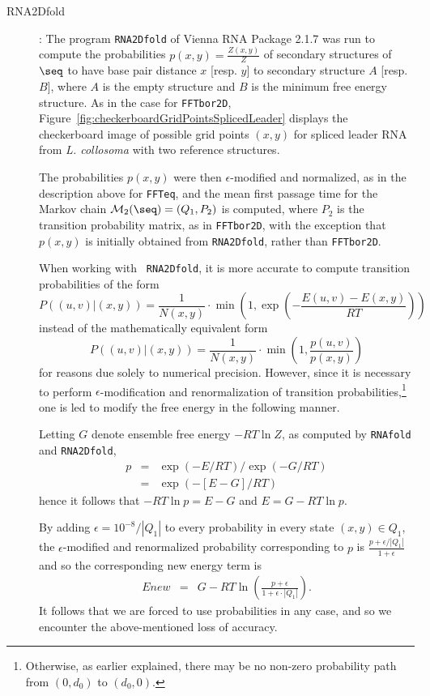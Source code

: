 \begin{description}
\item[RNA2Dfold]: The program {\tt RNA2Dfold} of Vienna RNA Package
2.1.7 was run to compute the probabilities $p(x,y) = \frac{Z(x,y)}{Z}$
of secondary structures of $\seq$ to have base pair distance $x$
[resp. $y$] to secondary structure $A$ [resp. $B$], where $A$ is the
empty structure and $B$ is the minimum free energy structure. As in
the case for {\tt FFTbor2D},
Figure~\ref{fig:checkerboardGridPointsSplicedLeader} displays the
checkerboard image of possible grid points $(x,y)$ for spliced leader
RNA from {\em L. collosoma} with two reference structures.

The probabilities $p(x,y)$ were then $\epsilon$-modified and
normalized, as in the description above for {\tt FFTeq}, and the mean
first passage time for the Markov chain $\mathcal{M}_2(\seq) =
(Q_1,P_2)$ is computed, where $P_2$ is the transition probability
matrix, as in {\tt FFTbor2D}, with the exception that $p(x,y)$ is
initially obtained from {\tt RNA2Dfold}, rather than {\tt FFTbor2D}.

When working with {\tt
RNA2Dfold}, it is more accurate to compute transition probabilities of
the form $$ P( (u,v) | (x,y) ) = \frac{1}{N(x,y)} \cdot \min(1,
\exp(-\frac{E(u,v)-E(x,y)}{RT})) $$ instead of the mathematically
equivalent form $$ P( (u,v) | (x,y) ) = \frac{1}{N(x,y)} \cdot \min(1,
\frac{p(u,v)}{p(x,y)}) $$ for reasons due solely to numerical
precision. However, since it is necessary to perform
$\epsilon$-modification and renormalization of transition
probabilities,\footnote{Otherwise, as earlier explained, there may be
no non-zero probability path from $(0,d_0)$ to $(d_0,0)$.} one is led
to modify the free energy in the following manner.

Letting $G$ denote ensemble free energy $-RT \ln Z$, as computed by
{\tt RNAfold} and {\tt RNA2Dfold},
\begin{eqnarray*}
p &=& \exp(-E/RT)/\exp(-G/RT) \\
&=& \exp(-[ E-G] /RT)
\end{eqnarray*}
hence it follows that $-RT \ln p = E-G$ and $E = G-RT \ln p$.

By adding $\epsilon=10^{-8}/|Q_1|$ to every probability in every state
$(x,y) \in Q_1$, the $\epsilon$-modified and renormalized probability
corresponding to $p$ is $\frac{p+\epsilon/|Q_1|}{1+ \epsilon}$ and so
the corresponding new energy term is
\begin{eqnarray}
\label{eqn:modifiedEnergyTerm} Enew &=& G- RT \ln( \frac{p+\epsilon}{1
+ \epsilon \cdot |Q_1|} ).
\end{eqnarray}
It follows that we are forced to use probabilities in any case, and so
we encounter the above-mentioned loss of accuracy.


\end{description}

